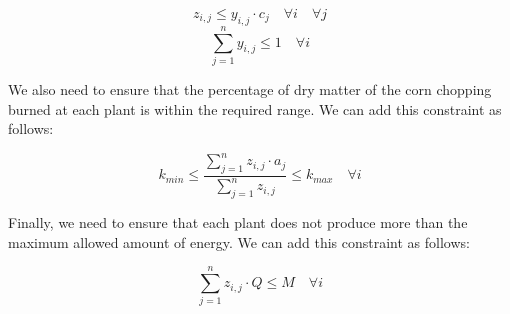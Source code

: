 \documentclass{article}
\begin{document}
$$ z_{i,j} \leq y_{i,j} \cdot c_j \quad \forall i \quad \forall j$$
$$\sum_{j=1}^n y_{i,j} \leq 1 \quad \forall i$$

We also need to ensure that the percentage of dry matter of the corn chopping burned at each plant is within the required range. We can add this constraint as follows:

$$k_{min} \leq \frac{\sum_{j=1}^n z_{i,j} \cdot a_j}{\sum_{j=1}^n z_{i,j}} \leq k_{max} \quad \forall i$$

Finally, we need to ensure that each plant does not produce more than the maximum allowed amount of energy. We can add this constraint as follows:

$$\sum_{j=1}^n z_{i,j} \cdot Q \leq M \quad \forall i$$
\end{document}
